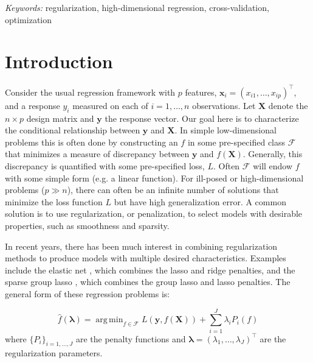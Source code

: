 \documentclass[12pt,letterpaper]{article}
\DeclareMathOperator*{\argmin}{arg\,min}
\begin{document}
\noindent%
{\it Keywords:}  regularization, high-dimensional regression, cross-validation, optimization
\vfill

\newpage
{} %
\section{Introduction}
\label{sec:intro}


Consider the usual regression framework with $p$ features, $\boldsymbol x_i = (x_{i1},\ldots,x_{ip})^\top$, and a response $y_i$ measured on each of $i=1,\ldots,n$ observations. Let $\boldsymbol X$ denote the $n \times p$ design matrix and $\boldsymbol y$ the response vector. Our goal here is to characterize the conditional relationship between $\boldsymbol y$ and $\boldsymbol X$. In simple low-dimensional problems this is often done by constructing an $f$ in some pre-specified class $\mathcal{F}$ that minimizes a measure of discrepancy between $\boldsymbol y$ and $f(\boldsymbol X)$. Generally, this discrepancy is quantified with some pre-specified loss, $L$. Often $\mathcal{F}$ will endow $f$ with some simple form (e.g. a linear function). For ill-posed or high-dimensional problems ($p \gg n$), there can often be an infinite number of solutions that minimize the loss function $L$ but have high generalization error. A common solution is to use regularization, or penalization, to select models with desirable properties, such as smoothness and sparsity.

In recent years, there has been much interest in combining regularization methods to produce models with multiple desired characteristics. Examples include the elastic net \citep{zou2003regression}, which combines the lasso and ridge penalties, and the sparse group lasso \citep{simon2013sparse}, which combines the group lasso and lasso penalties. The general form of these regression problems is:

\begin{equation} \label {eq:basic}
\hat f(\boldsymbol{\lambda}) = \argmin_{f\in\mathcal{F}} L\left (\boldsymbol{y}, f (\boldsymbol{X}) \right ) + \sum\limits_{i=1}^J \lambda_i P_i(f)
\end{equation}
where $\{P_i\}_{i=1, ..., J}$ are the penalty functions and $\boldsymbol{\lambda} = (\lambda_1, \ldots, \lambda_J)^\top$ are the regularization parameters.
\end{document}
